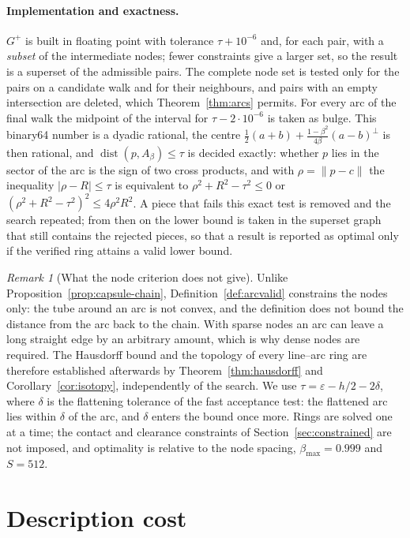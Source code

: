 \documentclass[11pt,a4paper]{article}
\theoremstyle{definition}
\theoremstyle{remark}
\newtheorem{remark}[theorem]{Remark}
\newcommand{\dist}{\operatorname{dist}}
\begin{document}
\paragraph{Implementation and exactness.} $G^{+}$ is built in floating point
with tolerance $\tau+10^{-6}$ and, for each pair, with a \emph{subset} of the
intermediate nodes; fewer constraints give a larger set, so the result is a
superset of the admissible pairs. The complete node set is tested only for the
pairs on a candidate walk and for their neighbours, and pairs with an empty
intersection are deleted, which Theorem~\ref{thm:arcs} permits. For every arc
of the final walk the midpoint of the interval for $\tau-2\cdot10^{-6}$ is
taken as bulge. This binary64 number is a dyadic rational, the centre
$\tfrac12(a+b)+\frac{1-\beta^{2}}{4\beta}(a-b)^{\perp}$ is then rational, and
$\dist(p,A_\beta)\le\tau$ is decided exactly: whether $p$ lies in the sector
of the arc is the sign of two cross products, and with $\rho=\lVert p-c\rVert$
the inequality $\lvert\rho-R\rvert\le\tau$ is equivalent to
$\rho^{2}+R^{2}-\tau^{2}\le0$ or
$(\rho^{2}+R^{2}-\tau^{2})^{2}\le4\rho^{2}R^{2}$. A piece that fails this exact
test is removed and the search repeated; from then on the lower bound is
taken in the superset graph that still contains the rejected pieces, so that
a result is reported as optimal only if the verified ring attains a valid
lower bound.

\begin{remark}[What the node criterion does not give]\label{rem:arcscope}
Unlike Proposition~\ref{prop:capsule-chain}, Definition~\ref{def:arcvalid}
constrains the nodes only: the tube around an arc is not convex, and the
definition does not bound the distance from the arc back to the chain. With
sparse nodes an arc can leave a long straight edge by an arbitrary amount,
which is why dense nodes are required. The Hausdorff bound and the topology of
every line--arc ring are therefore established afterwards by
Theorem~\ref{thm:hausdorff} and Corollary~\ref{cor:isotopy}, independently of
the search. We use $\tau=\varepsilon-h/2-2\delta$, where $\delta$ is the
flattening tolerance of the fast acceptance test: the flattened arc lies
within $\delta$ of the arc, and $\delta$ enters the bound once more. Rings are
solved one at a time; the contact and clearance constraints of
Section~\ref{sec:constrained} are not imposed, and optimality is relative to
the node spacing, $\beta_{\max}=0.999$ and $S=512$.
\end{remark}

\section{Description cost}
\end{document}
